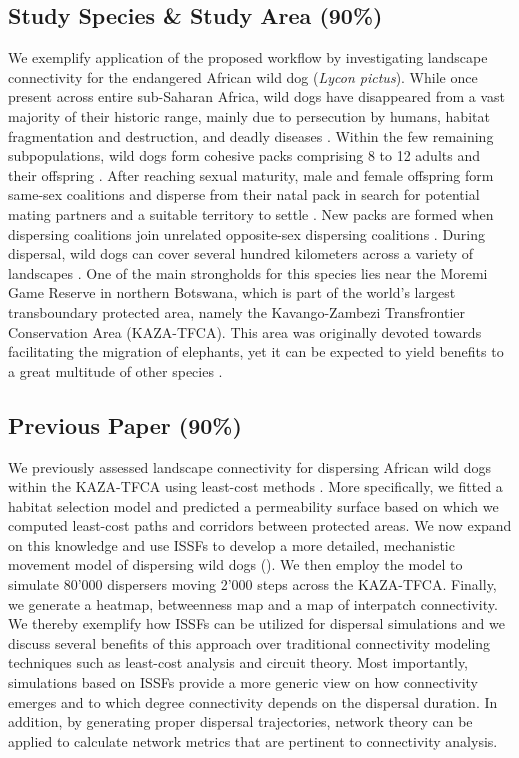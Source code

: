 \documentclass[abstract=on,10pt,a4paper,bibliography=totocnumbered]{article}
\begin{document}
\subsection{Study Species \& Study Area (90\%)}
We exemplify application of the proposed workflow by investigating landscape
connectivity for the endangered African wild dog (\textit{Lycon pictus}). While
once present across entire sub-Saharan Africa, wild dogs have disappeared from a
vast majority of their historic range, mainly due to persecution by humans,
habitat fragmentation and destruction, and deadly diseases
\citep{Woodroffe.2012}. Within the few remaining subpopulations, wild dogs form
cohesive packs comprising 8 to 12 adults and their offspring \cite{McNutt.1995}.
After reaching sexual maturity, male and female offspring form same-sex
coalitions and disperse from their natal pack in search for potential mating
partners and a suitable territory to settle \citep{McNutt.1996, Behr.2020}. New
packs are formed when dispersing coalitions join unrelated opposite-sex
dispersing coalitions \citep{McNutt.1996}. During dispersal, wild dogs can cover
several hundred kilometers across a variety of landscapes
\citep{DaviesMostert.2012, Masenga.2016, Cozzi.2020, Hofmann.2021}. One of the
main strongholds for this species lies near the Moremi Game Reserve in northern
Botswana, which is part of the world's largest transboundary protected area,
namely the Kavango-Zambezi Transfrontier Conservation Area (KAZA-TFCA). This
area was originally devoted towards facilitating the migration of elephants, yet
it can be expected to yield benefits to a great multitude of other species
\citep{Elliot.2014, Brennan.2020, Hofmann.2021}.

\subsection{Previous Paper (90\%)}
We previously assessed landscape connectivity for dispersing African wild dogs
within the KAZA-TFCA using least-cost methods \citep{Hofmann.2021}. More
specifically, we fitted a habitat selection model and predicted a permeability
surface based on which we computed least-cost paths and corridors between
protected areas. We now expand on this knowledge and use ISSFs to develop a more
detailed, mechanistic movement model of dispersing wild dogs
(). We then employ the model to simulate 80'000
dispersers moving 2'000 steps across the KAZA-TFCA. Finally, we generate a
heatmap, betweenness map and a map of interpatch connectivity. We thereby
exemplify how ISSFs can be utilized for dispersal simulations and we discuss
several benefits of this approach over traditional connectivity modeling
techniques such as least-cost analysis and circuit theory. Most importantly,
simulations based on ISSFs provide a more generic view on how connectivity
emerges and to which degree connectivity depends on the dispersal duration. In
addition, by generating proper dispersal trajectories, network theory can be
applied to calculate network metrics that are pertinent to connectivity
analysis.
\end{document}
